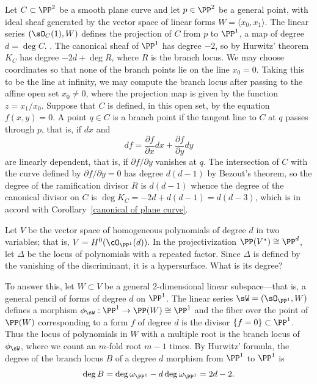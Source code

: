 \begin{example}
Let $C\subset \PP^2$ be a smooth plane curve and let $p\in \PP^2$ be a general point, with ideal
sheaf generated by the vector space of linear forms $W = \langle x_0,x_1\rangle$. 
The linear series $(\sO_C(1), W)$ defines the projection of $C$ from $p$ to $\PP^1$, a map of degree
$d = \deg C$.
. The canonical sheaf of $\PP^1$ has degree $-2$, so by Hurwitz' theorem
$K_C$ has degree $ -2d+ \deg R$, where $R$ is the branch locus. We may choose coordinates
so that none of the branch points lie on the line $x_0 = 0$. Taking this to be the line at infinity, we
may compute the branch locus after passing to the affine open set $x_0\neq 0$, where the projection
map is given by the function $z = x_1/x_0$.  Suppose that $C$ is defined, in this open set,
by the equation $f(x,y)= 0$. A point $q\in C$ is a branch point if the tangent line to $C$ at $q$
passes through $p$, that is, if $dx$  and 
$$
df = \frac{\partial f}{\partial x} dx + \frac{\partial f}{\partial y} dy
$$
are linearly dependent, that is, if $\partial f/{\partial y}$ vanishes at $q$. The intersection of 
$C$ with the curve defined by $\partial f/{\partial y}=0$ has degree $d(d-1)$ by Bezout's theorem,
so the degree of the ramification divisor $R$ is $d(d-1)$ whence the degree of the canonical
divisor on $C$ is $\deg K_C = -2d+d(d-1) = d(d-3)$, which is in accord with 
Corollary~\ref{canonical of plane curve}.

\end{example}

\begin{example}
 Let $V$ be the vector space of homogeneous polynomials of degree $d$ in two variables; that is, $V = H^0(\cO_{\PP^1}(d))$. In the projectivization $\PP(V^{*}) \cong \PP^d$, let $\Delta$ be the locus of polynomials with a repeated factor. Since $\Delta$ is defined by the vanishing of the discriminant, it is a hypersurface. What is its degree?
 
 To answer this, let $W\subset V$ be a general 2-dimensional linear subspace---that is, a general pencil of forms of degree $d$ on $\PP^1$. The linear series $\sW = (\sO_{\PP^{1}}, W)$ defines a morphism $\phi_{\sW} : \PP^{1} \to \PP(W) \cong \PP^{1}$ and the fiber over the point of $\PP(W)$ corresponding to a form $f$ of degree $d$ is the divisor $\{f = 0\}\subset \PP^{1}$. Thus the locus of polynomials in $W$ with a multiple root is the branch locus of $\phi_{\sW}$, where we count an $m$-fold root $m-1$ times.
 By Hurwitz' formula, the degree of the branch locus $B$ of a degree $d$ morphism from $\PP^{1}$ to $\PP^{1}$ is
 $$
 \deg B = \deg \omega_{\PP^{1}} - d\deg \omega_{\PP^{1}} = 2d-2.
 $$
 \end{example}
  

